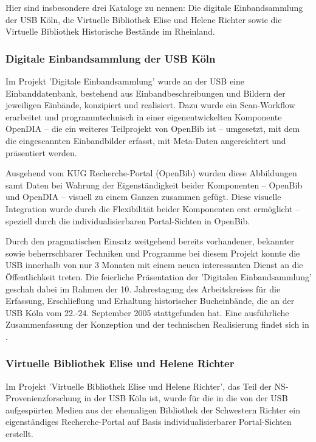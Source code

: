 \documentclass[11pt, twoside, a4paper, BCOR8mm, DIV12, bibtotoc,idxtotoc]{scrbook}
\begin{document}
Hier sind insbesondere drei Kataloge zu nennen: Die digitale
Einbandsammlung der USB Köln, die Virtuelle Bibliothek Elise und
Helene Richter sowie die Virtuelle Bibliothek Historische Bestände im
Rheinland.


\subsubsection{Digitale Einbandsammlung der USB Köln}

Im Projekt 'Digitale Einbandsammlung' wurde an der USB eine
Einbanddatenbank, bestehend aus Einbandbeschreibungen und Bildern der
jeweiligen Einbände, konzipiert und realisiert. Dazu wurde ein
Scan-Workflow erarbeitet und programmtechnisch in einer
eigenentwickelten Kom\-po\-nen\-te OpenDIA -- die ein weiteres Teilprojekt
von OpenBib ist -- umgesetzt, mit dem die eingescannten Einbandbilder
erfasst, mit Meta-Daten angereichtert und präsentiert werden.

Ausgehend vom KUG Recherche-Portal (OpenBib) wurden diese Abbildungen
samt Daten bei Wahrung der Eigenständigkeit beider Kom\-po\-nen\-ten --
OpenBib und OpenDIA -- visuell zu einem Ganzen zusammen gefügt. Diese
visuelle Integration wurde durch die Flexibilität beider Kom\-po\-nen\-ten
erst ermöglicht -- speziell durch die individualisierbaren
Portal-Sichten in OpenBib. 

Durch den pragmatischen Einsatz weitgehend bereits vorhandener,
bekannter sowie beherrschbarer Techniken und Programme bei diesem
Projekt konnte die USB innerhalb von nur 3 Monaten mit einem neuen
interessanten Dienst an die Öffentlichkeit treten. Die feierliche
Präsentation der 'Digitalen Einbandsammlung' geschah dabei im Rahmen
der 10.  Jahrestagung des Arbeitskreises für die Erfassung,
Erschließung und Erhaltung historischer Bucheinbände, die an der USB
Köln vom 22.-24.  September 2005 stattgefunden hat.  Eine
ausführliche Zusammenfassung der Kon\-zep\-tion und der technischen
Realisierung findet sich in \cite{BoeFli:EinbandDB}.


\subsubsection{Virtuelle Bibliothek Elise und Helene Richter}

Im Projekt 'Virtuelle Bibliothek Elise und Helene Richter', das Teil
der NS-Provenienzforschung in der USB Köln ist, wurde für die
in die von der USB aufgespürten Medien aus der ehemaligen Bibliothek
der Schwestern Richter ein eigenständiges Recherche-Portal auf Basis
indi\-vi\-duali\-sierbarer Portal-Sichten erstellt.
\end{document}
